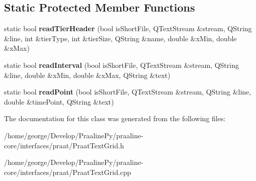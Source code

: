 \subsection*{Static Protected Member Functions}
\begin{DoxyCompactItemize}
\item 
\mbox{\label{class_praat_text_grid_a3b4abd1ddff03a614cb68712db5930f3}} 
static bool {\bfseries read\+Tier\+Header} (bool is\+Short\+File, Q\+Text\+Stream \&stream, Q\+String \&line, int \&tier\+Type, int \&tier\+Size, Q\+String \&name, double \&x\+Min, double \&x\+Max)
\item 
\mbox{\label{class_praat_text_grid_a620e2d9fba158f0efa4278224fa7b475}} 
static bool {\bfseries read\+Interval} (bool is\+Short\+File, Q\+Text\+Stream \&stream, Q\+String \&line, double \&x\+Min, double \&x\+Max, Q\+String \&text)
\item 
\mbox{\label{class_praat_text_grid_afc99f8526fd70cee2e4c15f899d3e68c}} 
static bool {\bfseries read\+Point} (bool is\+Short\+File, Q\+Text\+Stream \&stream, Q\+String \&line, double \&time\+Point, Q\+String \&text)
\end{DoxyCompactItemize}


The documentation for this class was generated from the following files\+:\begin{DoxyCompactItemize}
\item 
/home/george/\+Develop/\+Praaline\+Py/praaline-\/core/interfaces/praat/Praat\+Text\+Grid.\+h\item 
/home/george/\+Develop/\+Praaline\+Py/praaline-\/core/interfaces/praat/Praat\+Text\+Grid.\+cpp\end{DoxyCompactItemize}
